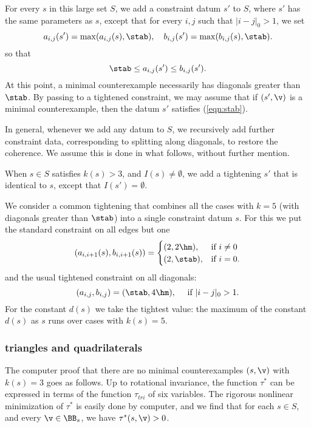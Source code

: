 For every $s$ in this large set $S$, 
we add a constraint datum $s'$ to $S$, where $s'$ has
the same parameters as $s$, except that for every $i,j$ such that $|i-j|_0>1$,
we set
\begin{equation}\label{eqn:s'}
a_{i,j}(s') = \max(a_{i,j}(s),\stab),\quad b_{i,j}(s')=\max(b_{i,j}(s),\stab).
\end{equation}
so that
\begin{equation}\label{eqn:stab}
\stab \le a_{i,j}(s')\le b_{i,j}(s').
\end{equation}
At this point,  a minimal counterexample
necessarily has diagonals greater than $\stab$.  By passing to a tightened
constraint, we may assume that if $(s',\v)$ is a minimal counterexample,
then the datum $s'$ satisfies (\ref{eqn:stab}).

In general, whenever we add any datum to $S$, we recursively add
further constraint data, corresponding to splitting along diagonals,
to restore the coherence.  We assume this is done in what follows, without
further mention.

When $s\in S$ satisfies $k(s)>3$, and $I(s)\ne\emptyset$, we add a
tightening $s'$ that is identical to $s$, except that
$I(s')=\emptyset$.

We consider a common tightening that combines all the cases with $k=5$
(with diagonals greater than $\stab$) into a single constraint datum
$s$.  For this we put the standard constraint on all edges but one
\[
(a_{i,i+1}(s),b_{i,i+1}(s))=
\begin{cases}
(2,2\hm),&\text{if } i\ne 0\\
(2,\stab),&\text{if } i=0.
\end{cases}
\]
and the usual tightened constraint on all diagonals:
\[
(a_{i,j},b_{i,j})=(\stab,4\hm),\quad \text{ if } |i-j|_0>1.
\]
For the constant $d(s)$ we take the tightest value: the maximum of
the constant $d(s)$ as $s$ runs over cases with $k(s)=5$.


\subsubsection{triangles and quadrilaterals}

The computer proof that there are no minimal counterexamples $(s,\v)$
with $k(s)=3$ goes as follows.  Up to rotational invariance, the function
$\tau^*$ can be expressed in terms of the function $\tau_{tri}$ of six
variables.  The rigorous nonlinear minimization of $\tau^*$ is easily done
by computer, and we find that for each $s\in S$, and every $\v\in \BB_s$,
we have $\tau^*(s,\v)>0$.

